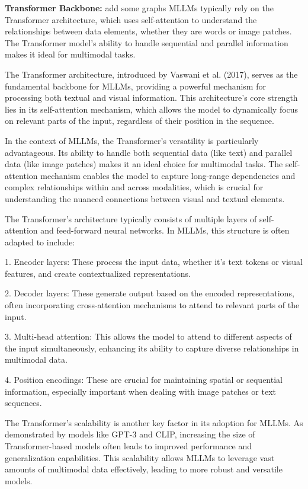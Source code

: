 \textbf{Transformer Backbone:} {\color{red}add some graphs} MLLMs typically rely on the Transformer architecture, which uses self-attention to understand the relationships between data elements, whether they are words or image patches. The Transformer model’s ability to handle sequential and parallel information makes it ideal for multimodal tasks.

The Transformer architecture, introduced by Vaswani et al. (2017), serves as the fundamental backbone for MLLMs, providing a powerful mechanism for processing both textual and visual information. This architecture's core strength lies in its self-attention mechanism, which allows the model to dynamically focus on relevant parts of the input, regardless of their position in the sequence.

In the context of MLLMs, the Transformer's versatility is particularly advantageous. Its ability to handle both sequential data (like text) and parallel data (like image patches) makes it an ideal choice for multimodal tasks. The self-attention mechanism enables the model to capture long-range dependencies and complex relationships within and across modalities, which is crucial for understanding the nuanced connections between visual and textual elements.

The Transformer's architecture typically consists of multiple layers of self-attention and feed-forward neural networks. In MLLMs, this structure is often adapted to include:

1. Encoder layers: These process the input data, whether it's text tokens or visual features, and create contextualized representations.

2. Decoder layers: These generate output based on the encoded representations, often incorporating cross-attention mechanisms to attend to relevant parts of the input.

3. Multi-head attention: This allows the model to attend to different aspects of the input simultaneously, enhancing its ability to capture diverse relationships in multimodal data.

4. Position encodings: These are crucial for maintaining spatial or sequential information, especially important when dealing with image patches or text sequences.

The Transformer's scalability is another key factor in its adoption for MLLMs. As demonstrated by models like GPT-3 and CLIP, increasing the size of Transformer-based models often leads to improved performance and generalization capabilities. This scalability allows MLLMs to leverage vast amounts of multimodal data effectively, leading to more robust and versatile models.

